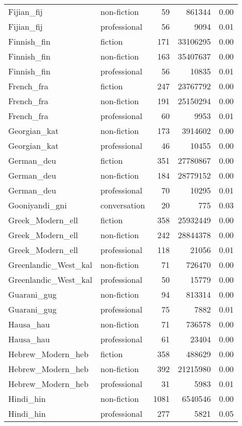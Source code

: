 \begin{longtable}{llrrr}
  Fijian\_fij & non-fiction & 59 & 861344 & 0.00 \\ 
  Fijian\_fij & professional & 56 & 9094 & 0.01 \\ 
  Finnish\_fin & fiction & 171 & 33106295 & 0.00 \\ 
  Finnish\_fin & non-fiction & 163 & 35407637 & 0.00 \\ 
  Finnish\_fin & professional & 56 & 10835 & 0.01 \\ 
  French\_fra & fiction & 247 & 23767792 & 0.00 \\ 
  French\_fra & non-fiction & 191 & 25150294 & 0.00 \\ 
  French\_fra & professional & 60 & 9953 & 0.01 \\ 
  Georgian\_kat & non-fiction & 173 & 3914602 & 0.00 \\ 
  Georgian\_kat & professional & 46 & 10455 & 0.00 \\ 
  German\_deu & fiction & 351 & 27780867 & 0.00 \\ 
  German\_deu & non-fiction & 184 & 28779152 & 0.00 \\ 
  German\_deu & professional & 70 & 10295 & 0.01 \\ 
  Gooniyandi\_gni & conversation & 20 & 775 & 0.03 \\ 
  Greek\_Modern\_ell & fiction & 358 & 25932449 & 0.00 \\ 
  Greek\_Modern\_ell & non-fiction & 242 & 28844378 & 0.00 \\ 
  Greek\_Modern\_ell & professional & 118 & 21056 & 0.01 \\ 
  Greenlandic\_West\_kal & non-fiction & 71 & 726470 & 0.00 \\ 
  Greenlandic\_West\_kal & professional & 50 & 15779 & 0.00 \\ 
  Guarani\_gug & non-fiction & 94 & 813314 & 0.00 \\ 
  Guarani\_gug & professional & 75 & 7882 & 0.01 \\ 
  Hausa\_hau & non-fiction & 71 & 736578 & 0.00 \\ 
  Hausa\_hau & professional & 61 & 23404 & 0.00 \\ 
  Hebrew\_Modern\_heb & fiction & 358 & 488629 & 0.00 \\ 
  Hebrew\_Modern\_heb & non-fiction & 392 & 21215980 & 0.00 \\ 
  Hebrew\_Modern\_heb & professional & 31 & 5983 & 0.01 \\ 
  Hindi\_hin & non-fiction & 1081 & 6540546 & 0.00 \\ 
  Hindi\_hin & professional & 277 & 5821 & 0.05 \\ 

\end{longtable}
